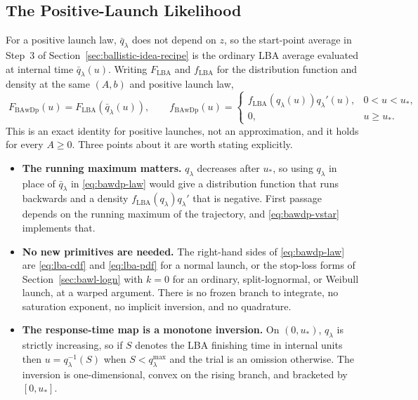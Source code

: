 \documentclass[12pt]{article}
\theoremstyle{remark}
\begin{document}
\subsection{The Positive-Launch Likelihood}
For a positive launch law, $\bar q_{\lambda}$ does not depend on $z$, so the start-point average in Step~3 of Section~\ref{sec:ballistic-idea-recipe} is the ordinary LBA average evaluated at internal time $\bar q_{\lambda}(u)$. Writing $F_{\mathrm{LBA}}$ and $f_{\mathrm{LBA}}$ for the distribution function and density at the same $(A,b)$ and positive launch law,
\begin{equation}
  \boxed{\;
  F_{\mathrm{BAwDp}}(u) = F_{\mathrm{LBA}}\!\left(\bar q_{\lambda}(u)\right),
  \qquad
  f_{\mathrm{BAwDp}}(u) =
  \begin{cases}
    f_{\mathrm{LBA}}\!\left(q_{\lambda}(u)\right) q_{\lambda}'(u),
      & 0 < u < u_{*},\\[3pt]
    0, & u \ge u_{*}.
  \end{cases}\;}
  \label{eq:bawdp-law}
\end{equation}
This is an exact identity for positive launches, not an approximation, and it holds for every $A\ge0$. Three points about it are worth stating explicitly.

\begin{itemize}
  \item \textbf{The running maximum matters.} $q_{\lambda}$ decreases after $u_{*}$, so using $q_{\lambda}$ in place of $\bar q_{\lambda}$ in
        \eqref{eq:bawdp-law} would give a distribution function that runs
        backwards and a density $f_{\mathrm{LBA}}(q_{\lambda})q_{\lambda}'$ that is negative. First passage depends on the running maximum of the trajectory, and \eqref{eq:bawdp-vstar} implements that.
  \item \textbf{No new primitives are needed.} The right-hand sides of
        \eqref{eq:bawdp-law} are \eqref{eq:lba-cdf} and \eqref{eq:lba-pdf} for a
        normal launch, or the stop-loss forms of Section~\ref{sec:bawl-logn} with $k = 0$ for an ordinary, split-lognormal, or Weibull launch, at a warped argument. There is no frozen branch to integrate, no saturation exponent, no implicit inversion, and no quadrature.
  \item \textbf{The response-time map is a monotone inversion.} On $(0, u_{*})$, $q_{\lambda}$ is strictly increasing, so if $S$ denotes the LBA finishing time in internal units then $u = q_{\lambda}^{-1}(S)$ when $S < q_{\lambda}^{\max}$ and the trial is an omission otherwise. The inversion is one-dimensional, convex on the rising branch, and bracketed by $[0, u_{*}]$.
\end{itemize}
\end{document}
